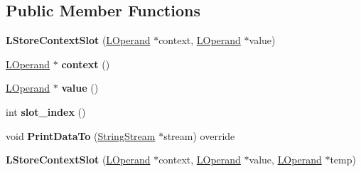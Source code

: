 \subsection*{Public Member Functions}
\begin{DoxyCompactItemize}
\item 
{\bfseries L\+Store\+Context\+Slot} (\hyperlink{classv8_1_1internal_1_1_l_operand}{L\+Operand} $\ast$context, \hyperlink{classv8_1_1internal_1_1_l_operand}{L\+Operand} $\ast$value)\hypertarget{classv8_1_1internal_1_1_l_store_context_slot_a0882cb037e96b067a175d98f9b8f0684}{}\label{classv8_1_1internal_1_1_l_store_context_slot_a0882cb037e96b067a175d98f9b8f0684}

\item 
\hyperlink{classv8_1_1internal_1_1_l_operand}{L\+Operand} $\ast$ {\bfseries context} ()\hypertarget{classv8_1_1internal_1_1_l_store_context_slot_a6b072f758dab90336746518191c017e6}{}\label{classv8_1_1internal_1_1_l_store_context_slot_a6b072f758dab90336746518191c017e6}

\item 
\hyperlink{classv8_1_1internal_1_1_l_operand}{L\+Operand} $\ast$ {\bfseries value} ()\hypertarget{classv8_1_1internal_1_1_l_store_context_slot_a0c28014969c34254ff6c3adcac58abbb}{}\label{classv8_1_1internal_1_1_l_store_context_slot_a0c28014969c34254ff6c3adcac58abbb}

\item 
int {\bfseries slot\+\_\+index} ()\hypertarget{classv8_1_1internal_1_1_l_store_context_slot_ae3af6274dd8f0678313b444f513b440d}{}\label{classv8_1_1internal_1_1_l_store_context_slot_ae3af6274dd8f0678313b444f513b440d}

\item 
void {\bfseries Print\+Data\+To} (\hyperlink{classv8_1_1internal_1_1_string_stream}{String\+Stream} $\ast$stream) override\hypertarget{classv8_1_1internal_1_1_l_store_context_slot_a559e1a9bb270f10754b7abd4f54768dc}{}\label{classv8_1_1internal_1_1_l_store_context_slot_a559e1a9bb270f10754b7abd4f54768dc}

\item 
{\bfseries L\+Store\+Context\+Slot} (\hyperlink{classv8_1_1internal_1_1_l_operand}{L\+Operand} $\ast$context, \hyperlink{classv8_1_1internal_1_1_l_operand}{L\+Operand} $\ast$value, \hyperlink{classv8_1_1internal_1_1_l_operand}{L\+Operand} $\ast$temp)\hypertarget{classv8_1_1internal_1_1_l_store_context_slot_ac22c1f367afeeac8612b5c3fce152218}{}\label{classv8_1_1internal_1_1_l_store_context_slot_ac22c1f367afeeac8612b5c3fce152218}


\end{DoxyCompactItemize}
